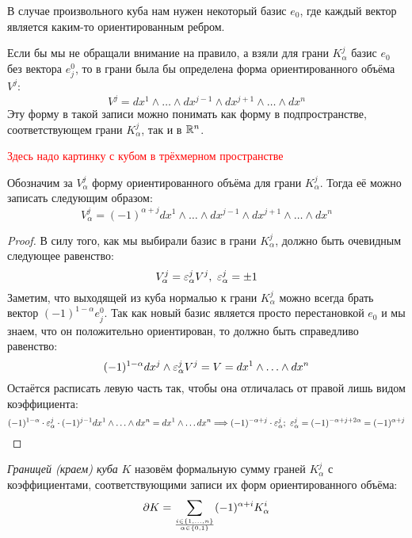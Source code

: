 \begin{anote}
	В случае произвольного куба нам нужен некоторый базис $e_0$, где каждый вектор является каким-то ориентированным ребром.
\end{anote}

\begin{anote}
	Если бы мы не обращали внимание на правило, а взяли для грани $K_\alpha^j$ базис $e_0$ без вектора $e_j^0$, то в грани была бы определена форма ориентированного объёма $V^j$:
	\[
		V^j = dx^1 \wedge \ldots \wedge dx^{j - 1} \wedge dx^{j + 1} \wedge \ldots \wedge dx^n
	\]
	Эту форму в такой записи можно понимать как форму в подпространстве, соответствующем грани $K_\alpha^j$, так и в $\mathbb{R}^n$.
\end{anote}

\textcolor{red}{Здесь надо картинку с кубом в трёхмерном пространстве}

\begin{proposition}
	Обозначим за $V_\alpha^j$ форму ориентированного объёма для грани $K_\alpha^j$. Тогда её можно записать следующим образом:
	\[
		V_\alpha^j = (-1)^{\alpha + j} dx^1 \wedge \ldots \wedge dx^{j - 1} \wedge dx^{j + 1} \wedge \ldots \wedge dx^n
	\]
\end{proposition}

\begin{proof}
	В силу того, как мы выбирали базис в грани $K_\alpha^j$, должно быть очевидным следующее равенство:
	\[
		V_\alpha^j = \varepsilon_\alpha^j V^j,\ \varepsilon_\alpha^j = \pm 1
	\]
	Заметим, что выходящей из куба нормалью к грани $K_\alpha^j$ можно всегда брать вектор $(-1)^{1 - \alpha}e_j^0$. Так как новый базис является просто перестановкой $e_0$ и мы знаем, что он положительно ориентирован, то должно быть справедливо равенство:
	\[
		(-1)^{1 - \alpha} dx^j \wedge \varepsilon_\alpha^j V^j = V = dx^1 \wedge \ldots \wedge dx^n
	\]
	Остаётся расписать левую часть так, чтобы она отличалась от правой лишь видом коэффициента:
	\[
		(-1)^{1 - \alpha} \cdot \eps_\alpha^j \cdot (-1)^{j - 1} dx^1 \wedge \ldots \wedge dx^n = dx^1 \wedge \ldots dx^n \Lora (-1)^{-\alpha + j} \cdot \eps_\alpha^j;\ \eps_\alpha^j = (-1)^{-\alpha + j + 2\alpha} = (-1)^{\alpha + j}
	\]
\end{proof}

\begin{definition}
	\textit{Границей (краем) куба} $K$ назовём формальную сумму граней $K_\alpha^j$ с коэффициентами, соответствующими записи их форм ориентированного объёма:
	\[
		\partial K = \sum_{i \in \{1, \ldots, n\} \over {\alpha \in \{0, 1\}}} (-1)^{\alpha + i} K_\alpha^i
	\]
\end{definition}

